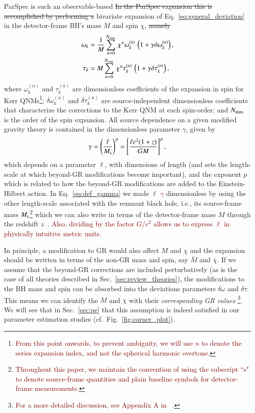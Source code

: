 \documentclass[twocolumn,
               prd,
               aps,
               superscriptaddress,
               tightenlines,
               nofootinbib,
               eqsecnum,
               amsfonts,
               amsmath,
               longbibliography]{revtex4-1}
\newcommand{\ag}[1]{{\textcolor{Maroon}{{#1}} }}
\begin{document}
ParSpec is such an observable-based
\sout{In the ParSpec expansion this is accomplished by performing a} bivariate
expansion of Eq.~\eqref{eq:general_deviation} in the detector-frame BH's mass
$M$ and spin $\chi$, \sout{namely}
%
\begin{subequations}
\label{eq:kerr_expansion}
\begin{align}
\omega_{k} &= \frac{1}{M} \sum_{n = 0}^{N_{\rm max}} \, \chi^{n} \omega^{(n)}_{k} \, \left( 1 + \gamma \delta \omega^{(n)}_{k} \right), \\
\tau_{k}   &= M     \sum_{n = 0}^{N_{\rm max}} \, \chi^{n} \tau^{(n)}_{k}   \, \left( 1 + \gamma \delta \tau^{(n)}_{k} \right),
\end{align}
\end{subequations}
%
where $\omega_{k}^{(n)}$ and $\tau_{k}^{(n)}$ are dimensionless coefficients of the
expansion in spin for Kerr QNMs\footnote{\ag{From this point onwards, to prevent ambiguity,
we will use $n$ to denote the series expansion index, and not the spherical 
harmonic overtone.}};
%
$\delta\omega_{k}^{(n)}$ and $\delta\tau_{k}^{(n)}$ are source-independent
dimensionless coefficients that characterize the corrections to the Kerr QNM at
each spin-order;
%
and $N_{\rm max}$ is the order of the spin expansion.
%
All source dependence on a given modified gravity theory is contained in the
dimensionless parameter $\gamma$, given by
%
\begin{equation}
\gamma
%
= \left(\frac{\ell}{M_{\rm s}}\right)^{p}
%
= \left[
\frac{\ell c^2 (1 + z)}{G M}
\right]^{p},
\label{eq:def_gamma}
\end{equation}
%
which depends on a parameter $\ell$, with dimensions of length (and sets the
length-scale at which beyond-GR modifications become important), and
the exponent $p$ which is related to how the beyond-GR modifications are
added to the Einstein-Hilbert action.
%
In Eq.~\eqref{eq:def_gamma} we made \sout{$\ell$} \ag{$\gamma$} dimensionless  by using the other
length-scale associated with the remnant black hole, i.e., its source-frame mass
$M_{\rm s}$\footnote{\ag{Throughout this paper, we maintain the convention of 
using the subscript ``s" to denote source-frame quantities and plain baseline 
symbols for detector-frame measurements.}} which we can also write in terms of the detector-frame mass $M$ through
the redshift $z$~\cite{Krolak:1987ofj}. \ag{Also, dividing by the factor $G/c^2$ allows us to
express $\ell$ in physically intuitive metric units.}

In principle, a modification to GR would also affect $M$ and $\chi$ and the
expansion should be written in terms of the non-GR mass and spin, say $\bar{M}$ and
$\bar{\chi}$. If we assume that the beyond-GR corrections are included perturbatively
(as is the case of all theories described in Sec.~\ref{sec:review_theories}),
the modifications to the BH mass and spin can be absorbed into the deviations
parameters $\delta\omega$ and $\delta\tau$.
%
This means we can identify the $M$ and $\chi$ with their \emph{corresponding GR values}
\footnote{\ag{For a more detailed discussion, see Appendix A in ~\cite{Maselli:2019mjd}.}}.
%
We will see that in Sec.~\ref{sec:pe} that this assumption is indeed
satisfied in our parameter estimation studies (cf.~Fig.~\ref{fig:corner_plot}).
\end{document}
